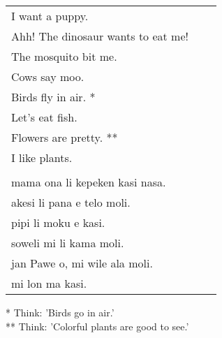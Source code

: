\begin{supertabular}{p{5,5cm}|ll}
I want a puppy. &&   \\ %
Ahh! The dinosaur wants to eat me!  &&  \\ %
The mosquito bit me.  &&  \\ %
Cows say moo.  &&  \\ %
Birds fly in air. * &&  \\ %
Let's eat fish.  &&  \\ %
Flowers are pretty. ** &&  \\ %
I like plants. &&   \\ %
 && \\ %
mama ona li kepeken kasi nasa.  &&  \\ %
akesi li pana e telo moli. &&  \\  %
pipi li moku e kasi.  &&  \\ %
soweli mi li kama moli.  &&  \\ %
jan Pawe o, mi wile ala moli. && \\   %
mi lon ma kasi. &&   \\ %
\end{supertabular} 

* Think: 'Birds go in air.' \\
** Think: 'Colorful plants are good to see.' 
